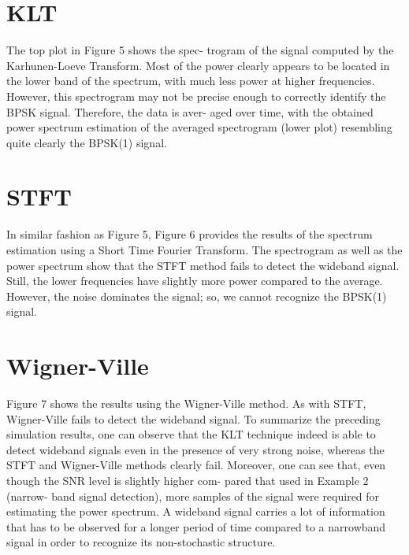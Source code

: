 \documentclass[12pt]{report}
\begin{document}
\section*{KLT}
The top plot in Figure 5 shows the spec-
trogram of the signal computed by the
Karhunen-Loeve Transform. Most of
the power clearly appears to be located
in the lower band of the spectrum, with
much less power at higher frequencies.
However, this spectrogram may not be
precise enough to correctly identify the
BPSK signal. Therefore, the data is aver-
aged over time, with the obtained power
spectrum estimation of the averaged
spectrogram (lower plot) resembling
quite clearly the BPSK(1) signal.
\section*{STFT}
In similar fashion as Figure 5, Figure
6 provides the results of the spectrum
estimation using a Short Time Fourier Transform. The spectrogram as well as the power spectrum show that the STFT method fails to detect the wideband signal.
Still, the lower frequencies have slightly more power compared to the average. However, the noise dominates the signal; so, we cannot recognize the
BPSK(1) signal.
\section*{Wigner-Ville}
Figure 7 shows the results using the Wigner-Ville method. As with STFT, Wigner-Ville fails to detect the wideband signal.
To summarize the preceding simulation results, one can observe that the KLT technique indeed is able to detect wideband signals even in the presence of very strong noise, whereas the STFT and Wigner-Ville methods clearly fail.
Moreover, one can see that, even though
the SNR level is slightly higher com-
pared that used in Example 2 (narrow-
band signal detection), more samples of
the signal were required for estimating
the power spectrum. A wideband signal
carries a lot of information that has to
be observed for a longer period of time
compared to a narrowband signal in
order to recognize its non-stochastic
structure.
\end{document}
